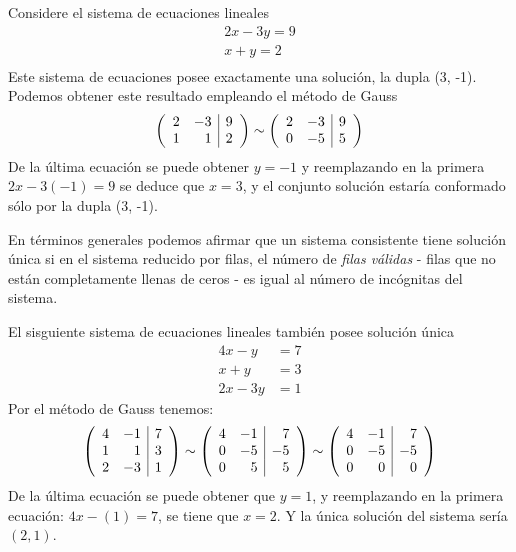 \begin{ejemplo}
Considere el sistema de ecuaciones lineales
\begin{align*}
2x-3y=9\\
x+y=2\\
\end{align*}
Este sistema de ecuaciones posee exactamente una solución, la dupla (3, -1). Podemos obtener este resultado empleando el método de Gauss
\begin{align*}
\reducir{rr|r}{
2&-3&9\\
1&1&2\\
}\sim
\reducir{rr|r}{
2&-3&9\\
0&-5&5\\
}
\end{align*}
De la última ecuación se puede obtener $y=-1$ y reemplazando en la primera $2x-3(-1)=9$ se deduce que $x=3$, y el conjunto solución estaría conformado sólo por la dupla (3, -1).
\end{ejemplo}


En términos generales podemos afirmar que un sistema consistente tiene solución única si en el sistema reducido por filas, el número de \textit{filas válidas} - filas que no están completamente llenas de ceros - es igual al número de incógnitas del sistema. 


\begin{ejemplo}
El sisguiente sistema de ecuaciones lineales también posee solución única
\begin{align*}
4x-y&=7\\
x+y&=3\\
2x-3y&=1
\end{align*}
Por el método de Gauss tenemos:
\begin{align*}
\reducir{rr|r}{
4&-1&7\\
1&1&3\\
2&-3&1\\
}\sim
\reducir{rr|r}{
4&-1&7\\
0&-5&-5\\
0&5&5\\
}\sim
\reducir{rr|r}{
4&-1&7\\
0&-5&-5\\
0&0&0\\
}
\end{align*}
De la última ecuación se puede obtener que $y=1$, y reemplazando en la primera ecuación: $4x-(1)=7$, se tiene que $x=2$. Y la única solución del sistema sería $(2, 1)$.

\end{ejemplo}

